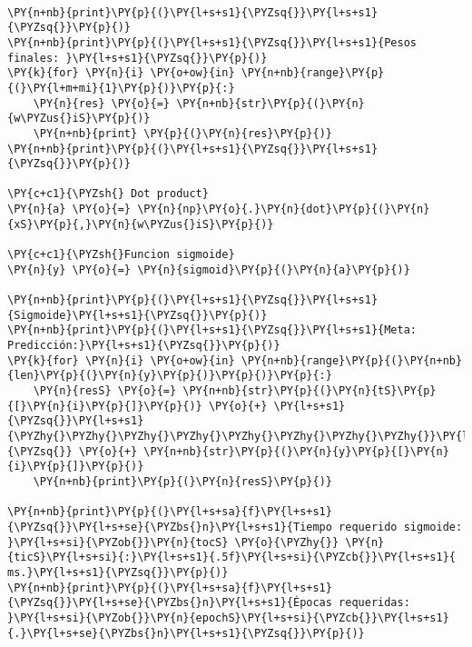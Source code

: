     \begin{center}
    \end{center}
    { \hspace*{\fill} \\}
    
    \begin{tcolorbox}[breakable, size=fbox, boxrule=1pt, pad at break*=1mm,colback=cellbackground, colframe=cellborder]
\begin{Verbatim}[commandchars=\\\{\}]
\PY{n+nb}{print}\PY{p}{(}\PY{l+s+s1}{\PYZsq{}}\PY{l+s+s1}{\PYZsq{}}\PY{p}{)}
\PY{n+nb}{print}\PY{p}{(}\PY{l+s+s1}{\PYZsq{}}\PY{l+s+s1}{Pesos finales: }\PY{l+s+s1}{\PYZsq{}}\PY{p}{)}
\PY{k}{for} \PY{n}{i} \PY{o+ow}{in} \PY{n+nb}{range}\PY{p}{(}\PY{l+m+mi}{1}\PY{p}{)}\PY{p}{:}
    \PY{n}{res} \PY{o}{=} \PY{n+nb}{str}\PY{p}{(}\PY{n}{w\PYZus{}iS}\PY{p}{)}
    \PY{n+nb}{print} \PY{p}{(}\PY{n}{res}\PY{p}{)}
\PY{n+nb}{print}\PY{p}{(}\PY{l+s+s1}{\PYZsq{}}\PY{l+s+s1}{\PYZsq{}}\PY{p}{)}

\PY{c+c1}{\PYZsh{} Dot product}
\PY{n}{a} \PY{o}{=} \PY{n}{np}\PY{o}{.}\PY{n}{dot}\PY{p}{(}\PY{n}{xS}\PY{p}{,}\PY{n}{w\PYZus{}iS}\PY{p}{)}

\PY{c+c1}{\PYZsh{}Funcion sigmoide}
\PY{n}{y} \PY{o}{=} \PY{n}{sigmoid}\PY{p}{(}\PY{n}{a}\PY{p}{)}

\PY{n+nb}{print}\PY{p}{(}\PY{l+s+s1}{\PYZsq{}}\PY{l+s+s1}{Sigmoide}\PY{l+s+s1}{\PYZsq{}}\PY{p}{)}
\PY{n+nb}{print}\PY{p}{(}\PY{l+s+s1}{\PYZsq{}}\PY{l+s+s1}{Meta:    Predicción:}\PY{l+s+s1}{\PYZsq{}}\PY{p}{)}
\PY{k}{for} \PY{n}{i} \PY{o+ow}{in} \PY{n+nb}{range}\PY{p}{(}\PY{n+nb}{len}\PY{p}{(}\PY{n}{y}\PY{p}{)}\PY{p}{)}\PY{p}{:}
    \PY{n}{resS} \PY{o}{=} \PY{n+nb}{str}\PY{p}{(}\PY{n}{tS}\PY{p}{[}\PY{n}{i}\PY{p}{]}\PY{p}{)} \PY{o}{+} \PY{l+s+s1}{\PYZsq{}}\PY{l+s+s1}{\PYZhy{}\PYZhy{}\PYZhy{}\PYZhy{}\PYZhy{}\PYZhy{}\PYZhy{}\PYZhy{}}\PY{l+s+s1}{\PYZsq{}} \PY{o}{+} \PY{n+nb}{str}\PY{p}{(}\PY{n}{y}\PY{p}{[}\PY{n}{i}\PY{p}{]}\PY{p}{)}
    \PY{n+nb}{print}\PY{p}{(}\PY{n}{resS}\PY{p}{)}

\PY{n+nb}{print}\PY{p}{(}\PY{l+s+sa}{f}\PY{l+s+s1}{\PYZsq{}}\PY{l+s+se}{\PYZbs{}n}\PY{l+s+s1}{Tiempo requerido sigmoide: }\PY{l+s+si}{\PYZob{}}\PY{n}{tocS} \PY{o}{\PYZhy{}} \PY{n}{ticS}\PY{l+s+si}{:}\PY{l+s+s1}{.5f}\PY{l+s+si}{\PYZcb{}}\PY{l+s+s1}{ ms.}\PY{l+s+s1}{\PYZsq{}}\PY{p}{)}
\PY{n+nb}{print}\PY{p}{(}\PY{l+s+sa}{f}\PY{l+s+s1}{\PYZsq{}}\PY{l+s+se}{\PYZbs{}n}\PY{l+s+s1}{Épocas requeridas: }\PY{l+s+si}{\PYZob{}}\PY{n}{epochS}\PY{l+s+si}{\PYZcb{}}\PY{l+s+s1}{.}\PY{l+s+se}{\PYZbs{}n}\PY{l+s+s1}{\PYZsq{}}\PY{p}{)}
\end{Verbatim}
\end{tcolorbox}

